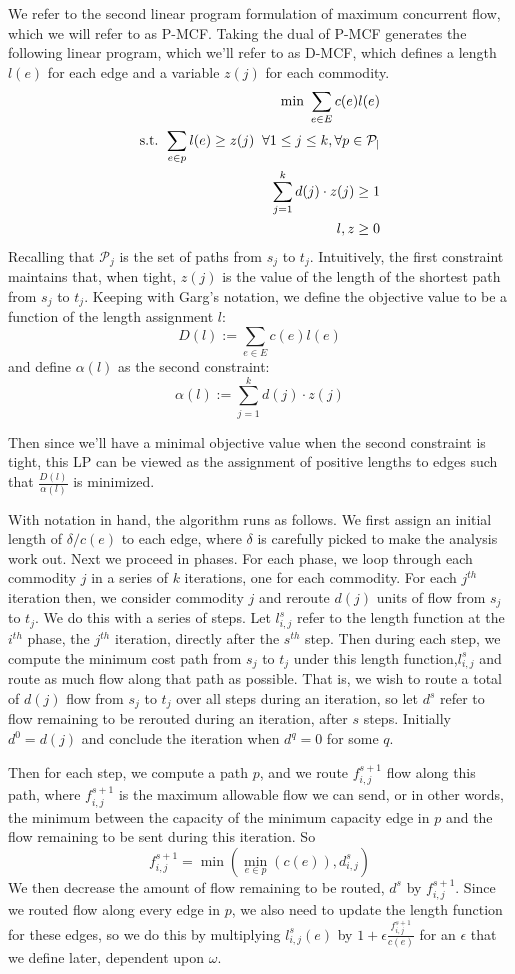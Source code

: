We refer to the second linear program formulation of maximum
concurrent flow, which we will refer to as P-MCF. Taking the dual of
P-MCF generates the following linear program, which we'll refer to as D-MCF, which defines a length
$l(e)$ for each edge and a variable $z(j)$ for each commodity.
\begin{align*}
\text{min     } \sum_{e\in E}c(e)l(e) \\
\text{s.t. }\sum_{e\in p}l(e) \geq z(j) \;\;\forall 1\leq j \leq k,
\forall p \in \cal{P}_j\\
\sum_{j=1}^kd(j)\cdot z(j)\geq 1\\
l,z\geq 0
\end{align*}
Recalling that $\mathcal{P}_j$ is the set of paths from $s_j$ to
$t_j$. Intuitively, the first constraint maintains that, when tight, $z(j)$ is the
value of the length of the shortest path from $s_j$ to $t_j$. Keeping
with Garg's notation, we define the objective value to be a function
of the length assignment $l$:
$$D(l) := \sum_{e\in E} c(e)l(e)$$
and define $\alpha(l)$ as the second constraint:
$$\alpha(l) := \sum_{j=1}^k d(j)\cdot z(j)$$

Then since we'll have a minimal objective value when the second
constraint is tight, this LP can be viewed as the assignment of
positive lengths to edges such that $\frac{D(l)}{\alpha(l)}$ is
minimized. 

With notation in hand, the algorithm runs as follows. We first assign
an initial length of $\delta/c(e)$ to each edge, where $\delta$ is carefully picked
to make the analysis work out. Next we proceed in phases. For each
phase, we loop through each commodity $j$ in a series of $k$
iterations, one for each commodity. For each $j^{th}$ iteration then, we
consider commodity $j$ and reroute $d(j)$ units of flow from $s_j$ to
$t_j$. We do this with a series of steps. Let $l_{i,j}^s$ refer to the
length function at the $i^{th}$ phase, the $j^{th}$ iteration,
directly after the $s^{th}$ step. Then during each step, we compute the minimum cost
path from $s_j$ to $t_j$ under this length function,$l_{i,j}^s$ and route as much
flow along that path as possible. That is, we wish to route a total of
$d(j)$ flow from $s_j$ to $t_j$ over all steps during an iteration, so
let $d^s$ refer to flow remaining to be rerouted during an
iteration, after $s$ steps. Initially $d^0=d(j)$ and conclude the
iteration when $d^q=0$ for some $q$. 

Then for each step, we compute a path $p$,
and we route $f_{i,j}^{s+1}$ flow along this path, where
$f_{i,j}^{s+1}$ is the maximum allowable flow we can send, or in other
words, the minimum between the capacity of the minimum capacity edge
in $p$ and the flow remaining to be sent during this iteration. So
$$f_{i,j}^{s+1}=\min(\min_{e\in p}(c(e)),d_{i,j}^s)$$
We then decrease the amount of flow remaining to be routed, $d^s$ by
$f_{i,j}^{s+1}$. Since we routed flow along every edge in $p$, we also
need to update the length function for these edges, so we do this by
multiplying $l_{i,j}^s(e)$ by $1+\epsilon \frac{f_{i,j}^{s+1}}{c(e)}$ for an
$\epsilon$ that we define later, dependent upon $\omega$. 

